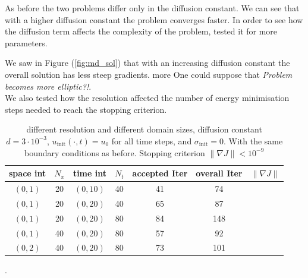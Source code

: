 \documentclass[../draft_1.tex]{subfiles}
\begin{document}
As before the two problems differ only in the diffusion constant. We can see that with a higher diffusion constant the problem converges faster. In order to see how the diffusion term affects the complexity of the problem, tested it for more parameters. 

We saw in Figure (\ref{fig:md_sol}) that with an increasing diffusion constant the overall solution has less steep gradients. more One could suppose that  \textit{Problem becomes more elliptic?!}.
\\


We also tested how the resolution affected the number of energy minimisation steps needed to reach the stopping criterion. 
\begin{table}[h!]
	\begin{center}
		\begin{tabular}{c | c | c | c | c | c | c} 
			\toprule
			space int & $N_x$ & time int & $N_t$ & accepted Iter & overall Iter & $\| \nabla J \|$ \\ 
			\toprule
			$(0,1)$ & 20 & $(0,10 )$ & 40 & 41 & 74 & \\ 
			$(0,1)$ & 20 & $(0,20 )$ & 40 & 65 & 87 & \\ 
			$(0,1)$ & 20 & $(0,20 )$ & 80 & 84 & 148 & \\ 
			$(0,1)$ & 40 & $(0,20 )$ & 80 & 57 & 92 & \\ 
			$(0,2)$ & 40 & $(0,20 )$ & 80 & 73 & 101 & \\
			\bottomrule
			
		\end{tabular}
	\end{center}
	\caption{different resolution and different domain sizes, diffusion constant $d=3 \cdot 10^{-3}$, $u_{\text{init}} (\cdot,t)= u_0$ for all time steps, and $\sigma_{\text{init}} = 0$. With the same boundary conditions as before. Stopping criterion $ \| \nabla J \| < 10^{-9}$}
	\label{table:diff_grids_md}
\end{table}

.




\end{document}
